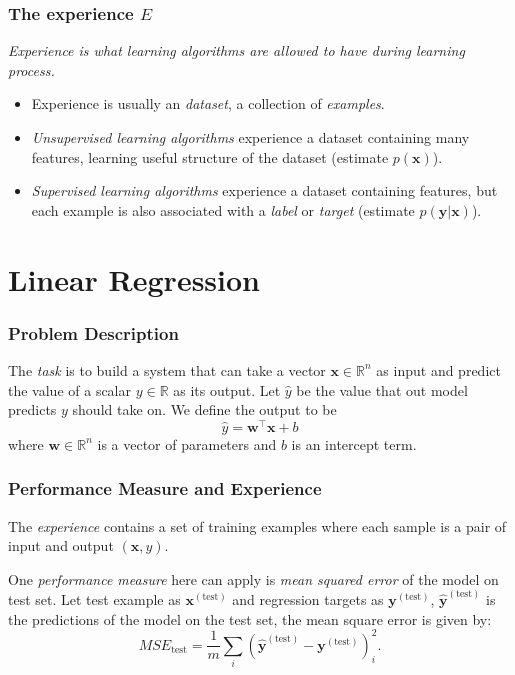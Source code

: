 \documentclass{beamer}
\begin{document}
\begin{frame}
  \frametitle{The experience $E$}

  \emph{Experience is what learning algorithms are allowed to have during learning process.}

  \begin{itemize}
    \item[\ding{229}] Experience is usually an \emph{dataset}, a collection of \emph{examples}.
    \item[\ding{229}] \emph{Unsupervised learning algorithms} experience a dataset containing many features, learning useful structure of the dataset (estimate $p(\bm{x})$).
    \item[\ding{229}] \emph{Supervised learning algorithms} experience a dataset containing features, but each example is also associated with a \emph{label} or \emph{target} (estimate $p(\bm{y}|\bm{x})$).
  \end{itemize}
  
\end{frame}

\section{Linear Regression}

\begin{frame}
  \frametitle{Problem Description}

  The \emph{task} is to build a system that can take a vector $\bm{x}\in\mathbb{R}^{n}$ as input and predict the value of a scalar $y\in\mathbb{R}$ as its output. Let $\hat{y}$ be the value that out model predicts $y$ should take on. We define the output to be
  \begin{equation*}
    \hat{y}=\bm{w}^{\top}\bm{x}+b
  \end{equation*}
  where $\bm{w}\in\mathbb{R}^{n}$ is a vector of parameters and $b$ is an intercept term.
\end{frame}

\begin{frame}
  \frametitle{Performance Measure and Experience}

  The \emph{experience} contains a set of training examples where each sample is a pair of input and output $(\bm{x}, y)$.

  One \emph{performance measure} here can apply is \emph{mean squared error} of the model on test set. Let test example as $\bm{x}^{(\text{test})}$ and regression targets as $\bm{y}^{(\text{test})}$, $\hat{\bm{y}}^{(\text{test})}$ is the predictions of the model on the test set, the mean square error is given by:
  \begin{equation*}
    MSE_{\text{test}}=\frac{1}{m}\sum_{i}(\hat{\bm{y}}^{(\text{test})}-\bm{y}^{(\text{test})})_{i}^{2}.
  \end{equation*}
\end{frame}
\end{document}
